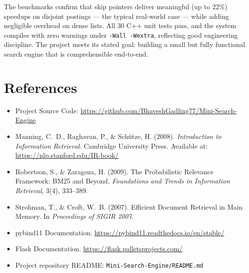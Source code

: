 \documentclass[12pt]{article}
\begin{document}
The benchmarks confirm that skip pointers deliver meaningful (up to 22\%) speedups on disjoint postings --- the typical real-world case --- while adding negligible overhead on dense lists. All 30 C++ unit tests pass, and the system compiles with zero warnings under \texttt{-Wall -Wextra}, reflecting good engineering discipline. The project meets its stated goal: building a small but fully functional search engine that is comprehensible end-to-end.

\section*{References}

\begin{itemize}
    \item Project Source Code: \url{https://github.com/BhaveshGadling77/Mini-Search-Engine}
    \item Manning, C.~D., Raghavan, P., \& Sch\"utze, H. (2008). \textit{Introduction to Information Retrieval}. Cambridge University Press. Available at: \url{https://nlp.stanford.edu/IR-book/}
    \item Robertson, S., \& Zaragoza, H. (2009). The Probabilistic Relevance Framework: BM25 and Beyond. \textit{Foundations and Trends in Information Retrieval}, 3(4), 333--389.
    \item Strohman, T., \& Croft, W.~B. (2007). Efficient Document Retrieval in Main Memory. In \textit{Proceedings of SIGIR 2007}.
    \item pybind11 Documentation. \url{https://pybind11.readthedocs.io/en/stable/}
    \item Flask Documentation. \url{https://flask.palletsprojects.com/}
    \item Project repository README: \texttt{Mini-Search-Engine/README.md}
\end{itemize}
\end{document}
